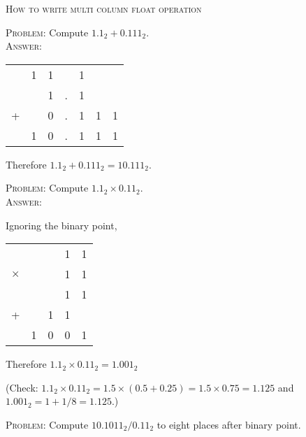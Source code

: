 \textsc{How to write multi column float operation}

\textsc{Problem:} Compute $1.1_{2} + 0.111_{2}$.
\\
\textsc{Answer:}\vspace{-2mm}
\begin{answerlong}
\begin{longtable}{ccccccc}
  & 1 & 1 &   & 1 &   &   \\
  &   & 1 & . & 1 &   &   \\
+ &   & 0 & . & 1 & 1 & 1 \\ \hline
  & 1 & 0 & . & 1 & 1 & 1 \\ \hline
\end{longtable}
Therefore $1.1_{2} + 0.111_{2} = 10.111_{2}$.
\end{answerlong}

\textsc{Problem:} Compute $1.1_{2} \times 0.11_{2}$.
\\
\textsc{Answer:}\vspace{-2mm}
\begin{answerlong}
  Ignoring the binary point,
\begin{longtable}{ccccc}
         &     &   & 1 & 1 \\
$\times$ &     &   & 1 & 1 \\ \hline
         &     &   & 1 & 1 \\
  +      &     & 1 & 1 &   \\ \hline
         &   1 & 0 & 0 & 1 \\ \hline
\end{longtable}
Therefore $1.1_{2} \times 0.11_{2} = 1.001_2$

(Check: $1.1_2 \times 0.11_2 = 1.5 \times (0.5 + 0.25) = 1.5 \times 0.75 = 1.125$ and $1.001_2 = 1 + 1/8 = 1.125$.)
\end{answerlong}

\newpage

\textsc{Problem:} Compute $10.1011_{2} / 0.11_{2}$ to eight places
after binary point.

